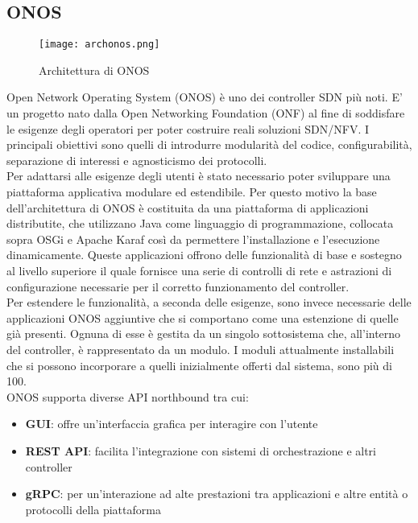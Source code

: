 \subsection{ONOS}
\begin{figure}[h]
    \centering
   \texttt{[image: archonos.png]}
    \caption{Architettura di ONOS \cite{archonos}}
    \label{fig:img3}
\end{figure}
Open Network Operating System (ONOS) \cite{ONOS} è uno dei controller SDN più noti. 
E' un progetto nato dalla Open Networking Foundation (ONF) \cite{ONF} al fine di soddisfare le esigenze degli operatori per poter costruire reali soluzioni SDN/NFV.
I principali obiettivi sono quelli di introdurre modularità del codice, configurabilità, separazione di interessi e agnosticismo dei protocolli.
\\Per adattarsi alle esigenze degli utenti è stato necessario poter sviluppare una piattaforma applicativa modulare ed estendibile.
Per questo motivo la base dell'architettura di ONOS è costituita da una piattaforma di applicazioni distributite, che utilizzano Java come linguaggio di programmazione,
collocata sopra OSGi \cite{osgi} e Apache Karaf \cite{Apache} così da permettere l'installazione e l'esecuzione dinamicamente. 
Queste applicazioni offrono delle funzionalità di base e sostegno al livello superiore il quale fornisce una serie di controlli di rete e astrazioni di configurazione necessarie per il corretto funzionamento del controller.
\\Per estendere le funzionalità, a seconda delle esigenze, sono invece necessarie delle applicazioni ONOS aggiuntive che si comportano come una estenzione di quelle già presenti. 
Ognuna di esse è gestita da un singolo sottosistema che, all'interno del controller, è rappresentato da un modulo.
I moduli attualmente installabili che si possono incorporare a quelli inizialmente offerti dal sistema, sono più di 100.
\\ONOS supporta diverse API northbound tra cui:
\begin{itemize}
\item \textbf{GUI}: offre un'interfaccia grafica per interagire con l'utente
\item \textbf{REST API}: facilita l'integrazione con sistemi di orchestrazione e altri controller 
\item \textbf{gRPC}: per un'interazione ad alte prestazioni tra applicazioni e altre entità o protocolli della piattaforma
\end{itemize}
